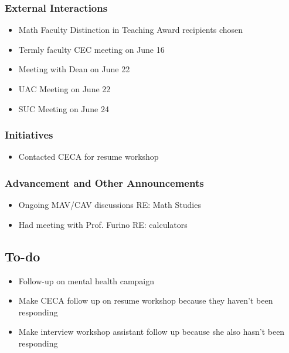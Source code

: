 \subsubsection*{External Interactions}
\begin{itemize}
	\item Math Faculty Distinction in Teaching Award recipients chosen
	\item Termly faculty CEC meeting on June 16
	\item Meeting with Dean on June 22
	\item UAC Meeting on June 22
	\item SUC Meeting on June 24
\end{itemize}

\subsubsection*{Initiatives}
\begin{itemize}
	\item Contacted CECA for resume workshop
\end{itemize}

\subsubsection*{Advancement and Other Announcements}
\begin{itemize}
	\item Ongoing MAV/CAV discussions RE: Math Studies
	\item Had meeting with Prof. Furino RE: calculators
\end{itemize}

\subsection*{To-do}
\begin{itemize}
	\item Follow-up on mental health campaign
	\item Make CECA follow up on resume workshop because they haven't been responding
	\item Make interview workshop assistant follow up because she also hasn't been responding
\end{itemize}